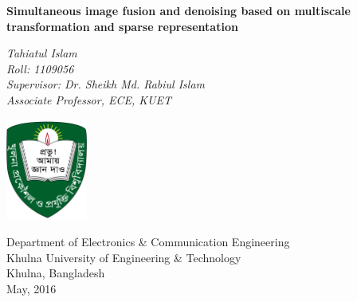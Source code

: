 \documentclass[12pt]{report}
\makeatletter
\theoremstyle{plain}
\theoremstyle{definition}
\renewcommand\section{\@startsection {section}{1}{\z@}%
                                   {-6ex \@plus -1ex \@minus -.2ex}%
                                   {2.3ex \@plus.2ex}%
                                   {\normalfont\Large\bfseries}}
\renewcommand\subsection{\@startsection {subsection}{1}{\z@}%
                                   {-4ex \@plus -1ex \@minus -.2ex}%
                                   {2.3ex \@plus.2ex}%
                                   {\normalfont\large\bfseries}}
\makeatother
\begin{document}
\setcounter{page}{1}


%
%

\begin{titlepage}
    \begin{center}
        \vspace*{1cm}
        
        \Large
        \textbf{Simultaneous image fusion and denoising based on multiscale transformation and sparse representation }
        
        
        \vspace{3.8cm}
        
        \textsl{
        Tahiatul Islam\\
        Roll: 1109056\\
        Supervisor: Dr. Sheikh Md. Rabiul Islam\\
        Associate Professor, ECE, KUET}
        
        \vspace{2.2cm}
        
        \includegraphics[width=0.2\textwidth]{Logo_KUET.png}
        
        \vspace{1cm}
        \Large
        Department of Electronics \& Communication Engineering\\
        Khulna University of Engineering \& Technology\\
        Khulna, Bangladesh\\
        May, 2016
        
    \end{center}
\end{titlepage}




%
%
%
%
\end{document}
